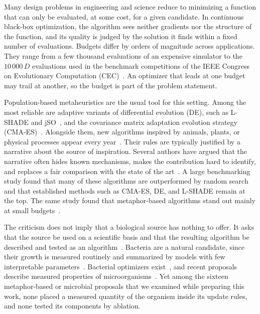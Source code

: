 \documentclass[preprint,12pt]{elsarticle}
\begin{document}
Many design problems in engineering and science reduce to minimizing a function
that can only be evaluated, at some cost, for a given candidate. In continuous
black-box optimization, the algorithm sees neither gradients nor the structure
of the function, and its quality is judged by the solution it finds within a
fixed number of evaluations. Budgets differ by orders of magnitude across
applications. They range from a few thousand evaluations of an expensive
simulator to the $10\,000\,D$ evaluations used in the benchmark competitions of
the IEEE Congress on Evolutionary Computation
(CEC)~\cite{liang2013cec2014,awad2016cec2017,kumar2021cec2022}. An optimizer
that leads at one budget may trail at another, so the budget is part of the
problem statement.

Population-based metaheuristics are the usual tool for this setting. Among the
most reliable are adaptive variants of differential evolution (DE), such as
L-SHADE and jSO~\cite{tanabe2014lshade,brest2017jso}, and the covariance matrix
adaptation evolution strategy (CMA-ES)~\cite{hansen2001cmaes}. Alongside them,
new algorithms inspired by animals, plants, or physical processes appear every
year~\cite{mirjalili2014gwo,heidari2019hho,fu2024sboa}. Their rules are
typically justified by a narrative about the source of inspiration. Several
authors have argued that the narrative often hides known mechanisms, makes the
contribution hard to identify, and replaces a fair comparison with the state of
the art~\cite{sorensen2015metaphor,aranha2022elephant}. A large benchmarking study found that many of these algorithms are
outperformed by random search and that established methods such as CMA-ES, DE,
and L-SHADE remain at the top. The same study found that metaphor-based
algorithms stand out mainly at small budgets~\cite{vermetten2024metaphor}.

The criticism does not imply that a biological source has nothing to offer. It
asks that the source be used on a scientific basis and that the resulting
algorithm be described and tested as an algorithm~\cite{aranha2022elephant}.
Bacteria are a natural candidate, since their growth is measured routinely and
summarized by models with few interpretable
parameters~\cite{zwietering1990growth}. Bacterial optimizers
exist~\cite{passino2002bfo,niu2012bco}, and recent proposals describe measured
properties of microorganisms~\cite{wang2024apo}. Yet among the sixteen
metaphor-based or microbial proposals that we examined while preparing this
work, none placed a measured quantity of the organism inside its update rules,
and none tested its components by ablation.
\end{document}
